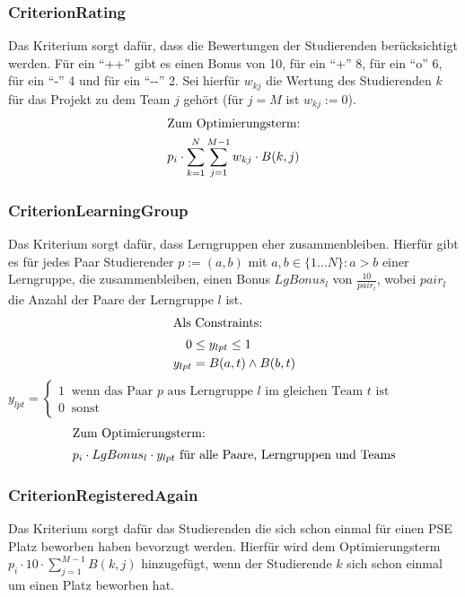 \documentclass[parskip=full]{scrartcl}
\begin{document}
\subsubsection{CriterionRating}
Das Kriterium sorgt dafür, dass die Bewertungen der Studierenden berücksichtigt
werden. Für ein \enquote{++} gibt es einen Bonus von 10, für ein \enquote{+} 8,
für ein \enquote{o} 6, für ein \enquote{-} 4 und für ein \enquote{-{}-} 2. Sei
hierfür $w_{kj}$ die Wertung des Studierenden $k$ für das Projekt zu dem Team
$j$ gehört (für $j = M$ ist $w_{kj} := 0$).
\begin{align*}
\intertext{Zum Optimierungsterm:}
p_i \cdot \sum_{k=1}^{N}\sum_{j=1}^{M-1}w_{kj} \cdot B(k,j)
\end{align*}

\subsubsection{CriterionLearningGroup}
Das Kriterium sorgt dafür, dass Lerngruppen eher zusammenbleiben. Hierfür gibt es
für jedes Paar Studierender $p:= (a,b)$ mit $a,b \in \{ 1\ldots N\}: a > b$
einer Lerngruppe, die zusammenbleiben, einen Bonus $LgBonus_l$ von $\frac{10}{pair_l}$, wobei $pair_l$ die Anzahl der Paare der
Lerngruppe $l$ ist.
\begin{align*}
\intertext{Als Constraints: }
0 &\le y_{lpt} \le 1  \\
y_{lpt} &= B(a,t) \wedge B(b,t)
\end{align*}
$y_{lpt} =\begin{cases}
1 \;\; \text{wenn das Paar $p$ aus
Lerngruppe $l$ im  gleichen Team $t$ ist} \\
0 \;\;\text{sonst}
\end{cases}$
\begin{align*}
\intertext{Zum Optimierungsterm: } 
p_i \cdot LgBonus_l \cdot y_{lpt} \text{ für alle Paare, Lerngruppen und Teams}
\end{align*} 

\subsubsection{CriterionRegisteredAgain}
Das Kriterium sorgt dafür das Studierenden die sich schon einmal für einen PSE
Platz beworben haben bevorzugt werden. Hierfür wird dem Optimierungsterm
$p_i \cdot 10 \cdot \sum_{j = 1}^{M-1} B(k,j)$ hinzugefügt, wenn der
Studierende $k$ sich schon einmal um einen Platz beworben hat.
\end{document}

